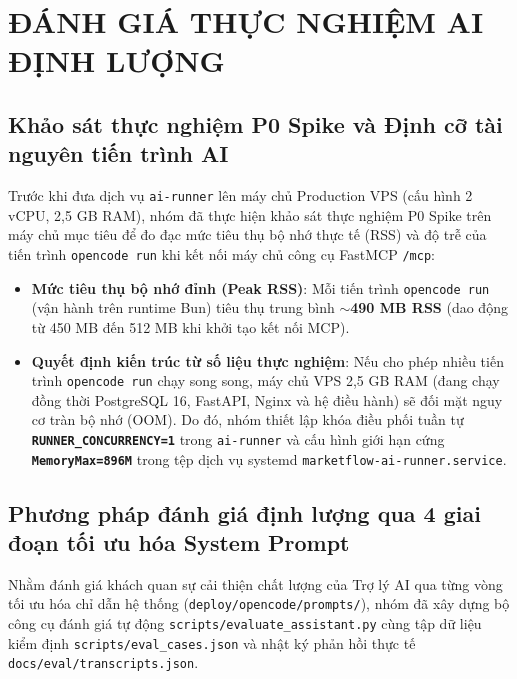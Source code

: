 \chapter{ĐÁNH GIÁ THỰC NGHIỆM AI ĐỊNH LƯỢNG}

\section{Khảo sát thực nghiệm P0 Spike và Định cỡ tài nguyên tiến trình AI}

Trước khi đưa dịch vụ \texttt{ai-runner} lên máy chủ Production VPS (cấu hình 2 vCPU, 2,5 GB RAM), nhóm đã thực hiện khảo sát thực nghiệm P0 Spike trên máy chủ mục tiêu để đo đạc mức tiêu thụ bộ nhớ thực tế (RSS) và độ trễ của tiến trình \texttt{opencode run} khi kết nối máy chủ công cụ FastMCP \texttt{/mcp}:
\begin{itemize}[noitemsep,topsep=2pt]
 \item \textbf{Mức tiêu thụ bộ nhớ đỉnh (Peak RSS)}: Mỗi tiến trình \texttt{opencode run} (vận hành trên runtime Bun) tiêu thụ trung bình \textbf{$\sim$490 MB RSS} (dao động từ 450 MB đến 512 MB khi khởi tạo kết nối MCP).
 \item \textbf{Quyết định kiến trúc từ số liệu thực nghiệm}: Nếu cho phép nhiều tiến trình \texttt{opencode run} chạy song song, máy chủ VPS 2,5 GB RAM (đang chạy đồng thời PostgreSQL 16, FastAPI, Nginx và hệ điều hành) sẽ đối mặt nguy cơ tràn bộ nhớ (OOM). Do đó, nhóm thiết lập khóa điều phối tuần tự \textbf{\texttt{RUNNER\_CONCURRENCY=1}} trong \texttt{ai-runner} và cấu hình giới hạn cứng \textbf{\texttt{MemoryMax=896M}} trong tệp dịch vụ systemd \texttt{marketflow-ai-runner.service}.
\end{itemize}

\section{Phương pháp đánh giá định lượng qua 4 giai đoạn tối ưu hóa System Prompt}

Nhằm đánh giá khách quan sự cải thiện chất lượng của Trợ lý AI qua từng vòng tối ưu hóa chỉ dẫn hệ thống (\texttt{deploy/opencode/prompts/}), nhóm đã xây dựng bộ công cụ đánh giá tự động \texttt{scripts/evaluate\_assistant.py} cùng tập dữ liệu kiểm định \texttt{scripts/eval\_cases.json} và nhật ký phản hồi thực tế \texttt{docs/eval/transcripts.json}.

